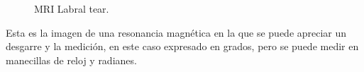 \documentclass{article}
\begin{document}
	 
	 
	\begin{figure}[h!tb]
	\centerline{}	%
	\caption{\label{fig:prueba} MRI Labral tear.}
	\end{figure}
	Esta es la imagen de una resonancia magnética en la que se puede apreciar un desgarre y la medición, en este caso expresado en grados, pero se puede medir en manecillas de reloj y radianes.
	 
	\ \\ \ \\
	 
\end{document}
